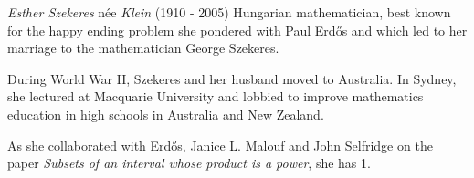 \documentclass[12pt]{article}
\begin{document}
\emph{Esther Szekeres} n\'ee \emph{Klein} (1910 - 2005) Hungarian mathematician, best known for the happy ending problem she pondered with Paul Erd\H{o}s and which led to her marriage to the mathematician George Szekeres.

During World War II, Szekeres and her husband moved to Australia. In Sydney, she lectured at Macquarie University and lobbied to improve mathematics education in high schools in Australia and New Zealand.

As she collaborated with Erd\H{o}s, Janice L. Malouf and John Selfridge on the paper {\it Subsets of an interval whose product is a power}, she has  1.
\end{document}
